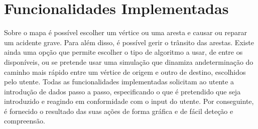 \documentclass[relatorio.tex]{subfiles}
\begin{document}
\section{Funcionalidades Implementadas}
\label{sec:functionality}

Sobre o mapa é possível escolher um vértice ou uma aresta e causar ou reparar um acidente grave.
Para além disso, é possível gerir o trânsito das arestas.
Existe ainda uma opção que permite escolher o tipo de algoritmo a usar, de entre os
disponíveis, ou se pretende usar uma simulação que dinamiza andeterminação do caminho
mais rápido entre um vértice de origem e outro de destino, escolhidos pelo utente.
Todas as funcionalidades implementadas solicitam ao utente a introdução de dados passo a passo,
especificando o que é pretendido que seja introduzido e reagindo em conformidade
com o input do utente. Por conseguinte, é fornecido o resultado das suas
ações de forma gráfica e de fácil deteção e compreensão.
\end{document}
